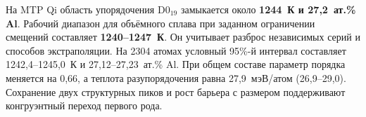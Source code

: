 На MTP Qi область упорядочения D0$_{19}$ замыкается около \textbf{1244~К и 27,2~ат.\% Al}. Рабочий диапазон для объёмного сплава при заданном ограничении смещений составляет \textbf{1240--1247~К}. Он учитывает разброс независимых серий и способов экстраполяции. На 2304 атомах условный 95\%-й интервал составляет 1242,4--1245,0~К и 27,12--27,23~ат.\% Al. При общем составе параметр порядка меняется на 0,66, а теплота разупорядочения равна 27,9~мэВ/атом (26,9--29,0). Сохранение двух структурных пиков и рост барьера с размером поддерживают конгруэнтный переход первого рода.
